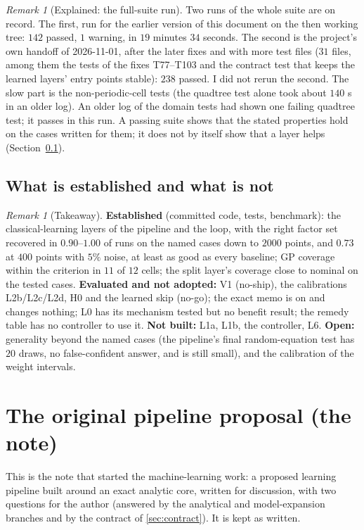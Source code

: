 \documentclass[11pt]{article}
\theoremstyle{plain}
\theoremstyle{definition}
\theoremstyle{remark}
\newtheorem{remark}[theorem]{Remark}
\newenvironment{keypoint}{\begin{remark}[Takeaway]}{\end{remark}}
\newenvironment{explained}[1]{\begin{remark}[Explained: #1]}{\end{remark}}
\begin{document}
\begin{explained}{the full-suite run}
Two runs of the whole suite are on record. The first, run for the earlier version of this document on the then working tree: $142$ passed, $1$ warning, in $19$ minutes $34$ seconds. The second is the project's own handoff of 2026-11-01, after the later fixes and with more test files ($31$ files, among them the tests of the fixes T77--T103 and the contract test that keeps the learned layers' entry points stable): $238$ passed. I did not rerun the second. The slow part is the non-periodic-cell tests (the quadtree test alone took about $140$ s in an older log). An older log of the domain tests had shown one failing quadtree test; it passes in this run. A passing suite shows that the stated properties hold on the cases written for them; it does not by itself show that a layer helps (Section~\ref{sec:status}).
\end{explained}

\subsection{What is established and what is not}\label{sec:status}
\begin{keypoint}
\textbf{Established} (committed code, tests, benchmark): the classical-learning layers of the pipeline and the loop, with the right factor set recovered in $0.90$--$1.00$ of runs on the named cases down to $2000$ points, and $0.73$ at $400$ points with $5\%$ noise, at least as good as every baseline; GP coverage within the criterion in $11$ of $12$ cells; the split layer's coverage close to nominal on the tested cases. \textbf{Evaluated and not adopted:} V1 (no-ship), the calibrations L2b/L2c/L2d, H0 and the learned skip (no-go); the exact memo is on and changes nothing; L0 has its mechanism tested but no benefit result; the remedy table has no controller to use it. \textbf{Not built:} L1a, L1b, the controller, L6. \textbf{Open:} generality beyond the named cases (the pipeline's final random-equation test has $20$ draws, no false-confident answer, and is still small), and the calibration of the weight intervals.
\end{keypoint}






\section{The original pipeline proposal (the note)}\label{app:note}
\noindent This is the note that started the machine-learning work: a proposed learning pipeline built around an exact analytic core, written for discussion, with two questions for the author (answered by the analytical and model-expansion branches and by the contract of \cref{sec:contract}). It is kept as written.
\end{document}
